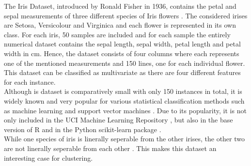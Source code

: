 The Iris Dataset, introduced by Ronald Fisher in 1936, contains the petal and sepal measurements of three different species of Iris flowers \cite{fisher1936use}. The considered irises are Setosa, Versicolour and Virginica and each flower is represented in its own class. For each iris, 50 samples are included and for each sample the entirely numerical dataset contains the sepal length, sepal width, petal length and petal width in cm. Hence, the dataset consists of four columns where each represents one of the mentioned measurements and 150 lines, one for each individual flower. This dataset can be classified as multivariate as there are four different features for each instance. \\
Although is dataset is comparatively small with only 150 instances in total, it is widely known and very popular for various statistical classification methods such as machine learning and support vector machines \cite{inproceedings}. Due to its popularity, it is not only included in the UCI Machine Learning Repository \cite{Dua2019}, but also in the base version of R \cite{rbase} and in the Python scikit-learn package \cite{scikitlearn}.\\
While one species of iris is linerally seperable from the other irises, the other two are not linerally seperable from each other \cite{Dua2019}. This makes this dataset an interesting case for clustering.